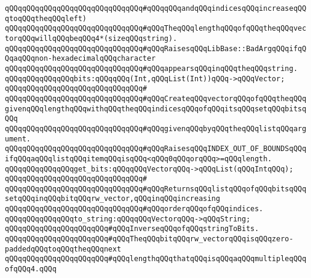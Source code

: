 \verb|qQQqqQQqqQQqqQQqqQQqqQQqqQQqqQQq#qQQqqQQqandqQQqindicesqQQqincreaseqQQqtoqQQqtheqQQqleft)|\newline
\verb|qQQqqQQqqQQqqQQqqQQqqQQqqQQqqQQq#qQQqTheqQQqlengthqQQqofqQQqtheqQQqvectorqQQqwillqQQqbeqQQq4*(sizeqQQqstring).|\newline
\verb|qQQqqQQqqQQqqQQqqQQqqQQqqQQqqQQq#qQQqRaisesqQQqLibBase::BadArgqQQqifqQQqaqQQqnon-hexadecimalqQQqcharacter|\newline
\verb|qQQqqQQqqQQqqQQqqQQqqQQqqQQqqQQq#qQQqappearsqQQqinqQQqtheqQQqstring.|\newline
\newline
\newline
\verb|qQQqqQQqqQQqqQQqbits:qQQqqQQq(Int,qQQqList(Int))qQQq->qQQqVector;|\newline
\verb|qQQqqQQqqQQqqQQqqQQqqQQqqQQqqQQq#|\newline
\verb|qQQqqQQqqQQqqQQqqQQqqQQqqQQqqQQq#qQQqCreateqQQqvectorqQQqofqQQqtheqQQqgivenqQQqlengthqQQqwithqQQqtheqQQqindicesqQQqofqQQqitsqQQqsetqQQqbitsqQQq|\newline
\verb|qQQqqQQqqQQqqQQqqQQqqQQqqQQqqQQq#qQQqgivenqQQqbyqQQqtheqQQqlistqQQqargument.|\newline
\verb|qQQqqQQqqQQqqQQqqQQqqQQqqQQqqQQq#qQQqRaisesqQQqINDEX_OUT_OF_BOUNDSqQQqifqQQqaqQQqlistqQQqitemqQQqisqQQq<qQQq0qQQqorqQQq>=qQQqlength.|\newline
\newline
\newline
\verb|qQQqqQQqqQQqqQQqget_bits:qQQqqQQqVectorqQQq->qQQqList(qQQqIntqQQq);|\newline
\verb|qQQqqQQqqQQqqQQqqQQqqQQqqQQqqQQq#|\newline
\verb|qQQqqQQqqQQqqQQqqQQqqQQqqQQqqQQq#qQQqReturnsqQQqlistqQQqofqQQqbitsqQQqsetqQQqinqQQqbitqQQqrw_vector,qQQqinqQQqincreasing|\newline
\verb|qQQqqQQqqQQqqQQqqQQqqQQqqQQqqQQq#qQQqorderqQQqofqQQqindices.|\newline
\newline
\newline
\verb|qQQqqQQqqQQqqQQqto_string:qQQqqQQqVectorqQQq->qQQqString;|\newline
\verb|qQQqqQQqqQQqqQQqqQQqqQQq#qQQqInverseqQQqofqQQqstringToBits.|\newline
\verb|qQQqqQQqqQQqqQQqqQQqqQQq#qQQqTheqQQqbitqQQqrw_vectorqQQqisqQQqzero-paddedqQQqtoqQQqtheqQQqnext|\newline
\verb|qQQqqQQqqQQqqQQqqQQqqQQq#qQQqlengthqQQqthatqQQqisqQQqaqQQqmultipleqQQqofqQQq4.qQQq|\newline

